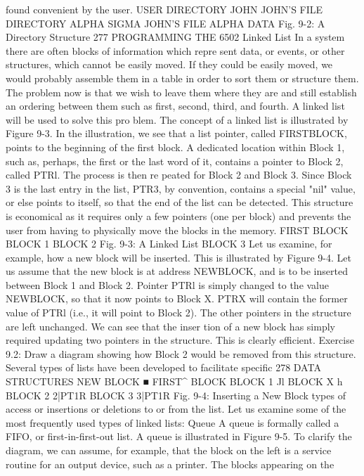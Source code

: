 {found convenient by the user.
USER DIRECTORY
JOHN
JOHN'S
FILE DIRECTORY
ALPHA
SIGMA
JOHN'S FILE
ALPHA
DATA
Fig. 9-2: A Directory Structure
277
PROGRAMMING THE 6502
Linked List
In a system there are often blocks of information which repre
sent data, or events, or other structures, which cannot be easily
moved. If they could be easily moved, we would probably assemble
them in a table in order to sort them or structure them. The
problem now is that we wish to leave them where they are and
still establish an ordering between them such as first, second,
third, and fourth. A linked list will be used to solve this pro
blem. The concept of a linked list is illustrated by Figure 9-3. In
the illustration, we see that a list pointer, called FIRSTBLOCK,
points to the beginning of the first block. A dedicated location
within Block 1, such as, perhaps, the first or the last word of it,
contains a pointer to Block 2, called PTRl. The process is then re
peated for Block 2 and Block 3. Since Block 3 is the last entry in
the list, PTR3, by convention, contains a special "nil" value, or
else points to itself, so that the end of the list can be detected. This
structure is economical as it requires only a few pointers (one per
block) and prevents the user from having to physically move the
blocks in the memory.
FIRST
BLOCK
BLOCK 1 BLOCK 2
Fig. 9-3: A Linked List
BLOCK 3
Let us examine, for example, how a new block will be inserted.
This is illustrated by Figure 9-4. Let us assume that the new block
is at address NEWBLOCK, and is to be inserted between Block 1
and Block 2. Pointer PTRl is simply changed to the value NEWBLOCK,
so that it now points to Block X. PTRX will contain the
former value of PTRl (i.e., it will point to Block 2). The other
pointers in the structure are left unchanged. We can see that the inser
tion of a new block has simply required updating two pointers in
the structure. This is clearly efficient.
Exercise 9.2: Draw a diagram showing how Block 2 would be
removed from this structure.
Several types of lists have been developed to facilitate specific
278
DATA STRUCTURES
NEW BLOCK ■
FIRST^
BLOCK
BLOCK 1 Jl
BLOCK X h
BLOCK 2 2|PT1R BLOCK 3 3|PT1R Fig. 9-4: Inserting a New Block
types of access or insertions or deletions to or from the list. Let us
examine some of the most frequently used types of linked lists:
Queue
A queue is formally called a FIFO, or first-in-first-out list. A
queue is illustrated in Figure 9-5. To clarify the diagram, we can
assume, for example, that the block on the left is a service routine
for an output device, such as a printer. The blocks appearing on the
}
